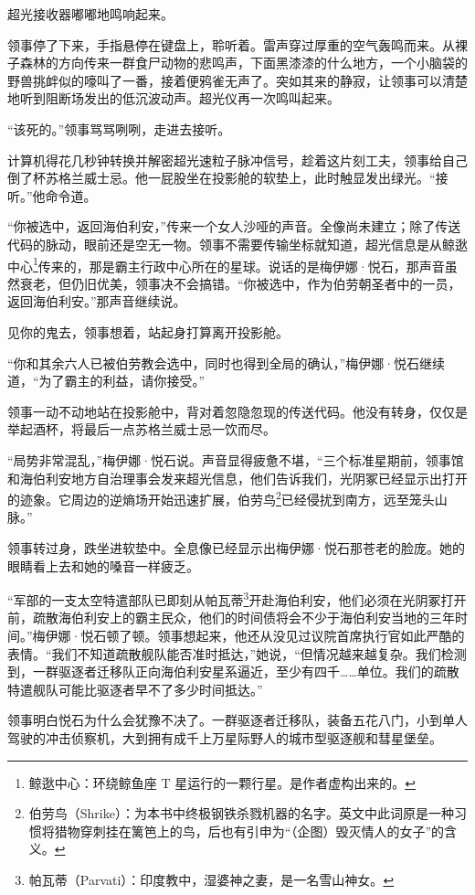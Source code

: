 \documentclass[AutoFakeBold=true]{book}
\begin{document}
超光接收器嘟嘟地鸣响起来。

领事停了下来，手指悬停在键盘上，聆听着。雷声穿过厚重的空气轰鸣而来。从裸子森林的方向传来一群食尸动物的悲鸣声，下面黑漆漆的什么地方，一个小脑袋的野兽挑衅似的嚎叫了一番，接着便鸦雀无声了。突如其来的静寂，让领事可以清楚地听到阻断场发出的低沉波动声。超光仪再一次鸣叫起来。

``该死的。''领事骂骂咧咧，走进去接听。

计算机得花几秒钟转换并解密超光速粒子脉冲信号，趁着这片刻工夫，领事给自己倒了杯苏格兰威士忌。他一屁股坐在投影舱的软垫上，此时触显发出绿光。``接听。''他命令道。

``你被选中，返回海伯利安，''传来一个女人沙哑的声音。全像尚未建立；除了传送代码的脉动，眼前还是空无一物。领事不需要传输坐标就知道，超光信息是从鲸逖中心\footnote{鲸逖中心：环绕鲸鱼座 T 星运行的一颗行星。是作者虚构出来的。}传来的，那是霸主行政中心所在的星球。说话的是梅伊娜·悦石，那声音虽然衰老，但仍旧优美，领事决不会搞错。``你被选中，作为伯劳朝圣者中的一员，返回海伯利安。''那声音继续说。

{\kaishu 见你的鬼去}，领事想着，站起身打算离开投影舱。

``你和其余六人已被伯劳教会选中，同时也得到全局的确认，''梅伊娜·悦石继续道，``为了霸主的利益，请你接受。''

领事一动不动地站在投影舱中，背对着忽隐忽现的传送代码。他没有转身，仅仅是举起酒杯，将最后一点苏格兰威士忌一饮而尽。

``局势非常混乱，''梅伊娜·悦石说。声音显得疲惫不堪，``三个标准星期前，领事馆和海伯利安地方自治理事会发来超光信息，他们告诉我们，光阴冢已经显示出打开的迹象。它周边的逆熵场开始迅速扩展，伯劳鸟\footnote{伯劳鸟（Shrike）：为本书中终极钢铁杀戮机器的名字。英文中此词原是一种习惯将猎物穿刺挂在篱笆上的鸟，后也有引申为``（企图）毁灭情人的女子''的含义。}已经侵扰到南方，远至笼头山脉。''

领事转过身，跌坐进软垫中。全息像已经显示出梅伊娜·悦石那苍老的脸庞。她的眼睛看上去和她的嗓音一样疲乏。

``军部的一支太空特遣部队已即刻从帕瓦蒂\footnote{帕瓦蒂（Parvati）：印度教中，湿婆神之妻，是一名雪山神女。}开赴海伯利安，他们必须在光阴冢打开前，疏散海伯利安上的霸主民众，他们的时间债将会不少于海伯利安当地的三年时间。''梅伊娜·悦石顿了顿。领事想起来，他还从没见过议院首席执行官如此严酷的表情。``我们不知道疏散舰队能否准时抵达，''她说，``但情况越来越复杂。我们检测到，一群驱逐者迁移队正向海伯利安星系逼近，至少有四千……单位。我们的疏散特遣舰队可能比驱逐者早不了多少时间抵达。''

领事明白悦石为什么会犹豫不决了。一群驱逐者迁移队，装备五花八门，小到单人驾驶的冲击侦察机，大到拥有成千上万星际野人的城市型驱逐舰和彗星堡垒。
\end{document}
